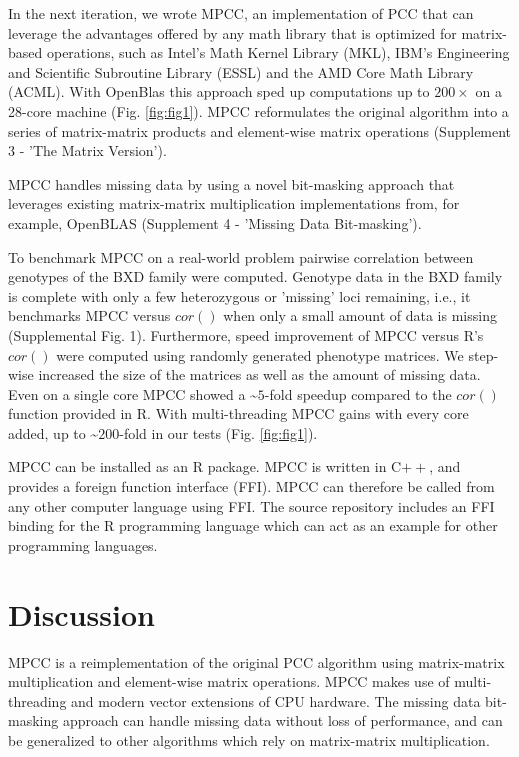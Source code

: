 \documentclass{bioinfo}
\begin{document}
In the next iteration, we wrote MPCC, an implementation of PCC that
can leverage the advantages offered by any math library that is
optimized for matrix-based operations, such as Intel’s Math Kernel
Library (MKL), IBM’s Engineering and Scientific Subroutine Library
(ESSL) and the AMD Core Math Library (ACML). With OpenBlas this
approach sped up computations up to $200\times$ on a 28-core machine
(Fig. \ref{fig:fig1}).  MPCC reformulates the original algorithm into
a series of matrix-matrix products and element-wise matrix operations
(Supplement 3 - 'The Matrix Version').

MPCC handles missing data by using a novel bit-masking approach that
leverages existing matrix-matrix multiplication implementations from,
for example, OpenBLAS (Supplement 4 - 'Missing Data Bit-masking').

To benchmark MPCC on a real-world problem pairwise correlation between
genotypes of the BXD family were computed. Genotype data in the BXD
family is complete with only a few heterozygous or 'missing' loci
remaining, i.e., it benchmarks MPCC versus $cor()$ when only a small amount
of data is missing (Supplemental Fig. 1). Furthermore, speed improvement of MPCC
versus R's $cor()$ were computed using randomly generated phenotype matrices.
We step-wise increased the size of the matrices as well as the amount of
missing data. Even on a single core MPCC showed a \textasciitilde{}$5$-fold
speedup compared to the $cor()$ function provided in R. With multi-threading
MPCC gains with every core added, up to \textasciitilde{}$200$-fold in our
tests (Fig. \ref{fig:fig1}).

MPCC can be installed as an R package. MPCC is written in C$++$, and
provides a foreign function interface (FFI). MPCC can therefore be
called from any other computer language using FFI. The source
repository includes an FFI binding for the R programming language
which can act as an example for other programming languages.

\section{Discussion}

MPCC is a reimplementation of the original PCC algorithm using matrix-matrix
multiplication and element-wise matrix operations. MPCC makes use of
multi-threading and modern vector extensions of CPU hardware. The missing
data bit-masking approach can handle missing data without loss of performance,
and can be generalized to other algorithms which rely on matrix-matrix multiplication.
\end{document}

